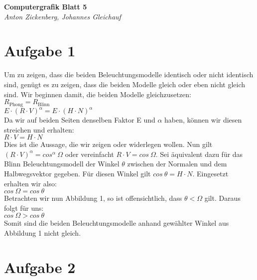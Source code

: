 \documentclass[12pt]{article}
\begin{document}
\begin{center}
 \textbf{\Large Computergrafik Blatt 5}\\
 \emph{Anton Zickenberg, Johannes Gleichauf}
\end{center}

\section*{Aufgabe 1}
Um zu zeigen, dass die beiden Beleuchtungsmodelle identisch oder nicht identisch sind, genügt es zu zeigen, dass die beiden Modelle gleich oder eben nicht gleich sind. Wir beginnen damit, die beiden Modelle gleichzusetzen:\\
$R_{\text{Phong}} = R_{\text{Blinn}}$\\
$E \cdot (R \cdot V) ^{\alpha} =  E \cdot (H \cdot N)^{\alpha}$\\
Da wir auf beiden Seiten denselben Faktor E und $\alpha$ haben, können wir diesen streichen und erhalten:\\
$R \cdot V = H \cdot N$\\
Dies ist die Aussage, die wir zeigen oder widerlegen wollen. Nun gilt $(R \cdot V)^{\alpha} = cos^{\alpha}\ \Omega$ oder vereinfacht $R \cdot V = cos\ \Omega$. Sei äquivalent dazu für das Blinn Beleuchtungsmodell der Winkel $\theta$ zwischen der Normalen und dem Halbwegsvektor gegeben. Für diesen Winkel gilt $cos\ \theta = H \cdot N$. Eingesetzt erhalten wir also:\\
$cos\ \Omega = cos\ \theta$\\
Betrachten wir nun Abbildung 1, so ist offensichtlich, dass $\theta < \Omega$ gilt. Daraus folgt für uns:\\
$cos\ \Omega > cos\ \theta$\\
Somit sind die beiden Beleuchtungsmodelle anhand gewählter Winkel aus Abbildung 1 nicht gleich.
\section*{Aufgabe 2}
\end{document}
